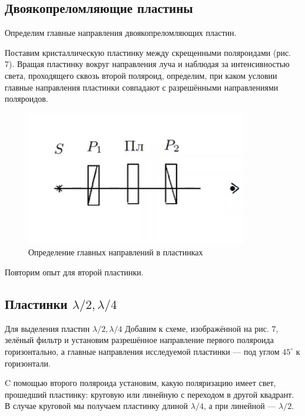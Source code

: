 \subsection{Двоякопреломляющие пластины}

Определим главные направления двоякопреломляющих пластин. 

Поставим кристаллическую пластинку между скрещенными поляроидами (рис. 7). Вращая пластинку вокруг направления луча и наблюдая за интенсивностью света, проходящего сквозь второй поляроид, определим, при каком условии главные направления пластинки совпадают с разрешёнными направлениями поляроидов. 

\begin{figure}
	\includegraphics[width=\linewidth]{7}
	\caption{Определение главных
		направлений в пластинках}
	\label{ris 7}
\end{figure}

Повторим опыт для второй пластинки.

\subsection{Пластинки $ \lambda/2, \lambda/4 $}

Для выделения пластин $ \lambda/2, \lambda/4 $ Добавим к схеме, изображённой на рис. 7, зелёный фильтр и установим разрешённое направление первого поляроида горизонтально, а главные направления исследуемой пластинки --- под углом $ 45^\circ $ к горизонтали.

C помощью второго поляроида установим, какую поляризацию
имеет свет, прошедший пластинку: круговую или линейную с переходом
в другой квадрант. В случае круговой мы получаем пластинку длиной $ \lambda/4 $, а при линейной --- $ \lambda/2 $.


